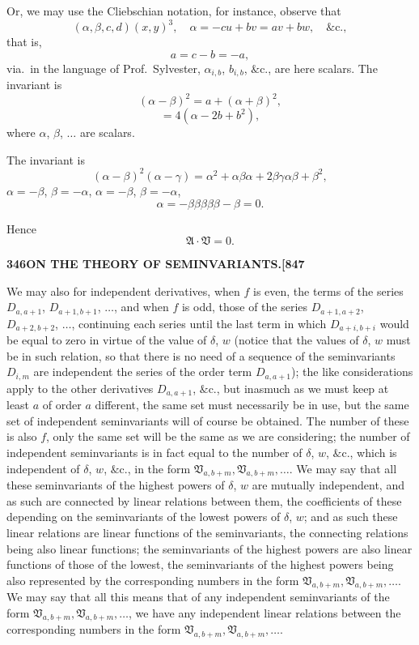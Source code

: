 \documentclass[11pt,a4paper]{book}
\begin{document}
Or, we may use the Cliebschian notation, for instance, observe that
\[
(\alpha, \beta, c, d)(x, y)^3, \quad \alpha = -cu + bv = av + bw, \quad \&\text{c.},
\]
that is,
\[
a = c - b = -a,
\]
via.\ in the language of Prof.\ Sylvester, $\alpha_{i,b}$, $b_{i,b}$, $\&\text{c.}$, are here scalars. The invariant is
\[
(\alpha - \beta)^2 = a + (\alpha + \beta)^2,
\]
\[
= 4(\alpha - 2b + b^2),
\]
where $\alpha$, $\beta$, $\ldots$ are scalars.

The invariant is
\[
(\alpha - \beta)^2(\alpha - \gamma) = \alpha^2 + \alpha\beta\alpha + 2\beta\gamma\alpha\beta + \beta^2,
\]
$\alpha = -\beta$, $\beta = -\alpha$, $\alpha = -\beta$, $\beta = -\alpha$,
\[
\alpha = -\beta\beta\beta\beta\beta - \beta = 0.
\]

Hence
\[
\mathfrak{A} \cdot \mathfrak{V} = 0.
\]

\newpage
\setcounter{page}{346}

\noindent\textbf{346}\hfill\textbf{ON THE THEORY OF SEMINVARIANTS.}\hfill\textbf{[847}

\bigskip

\noindent We may also for independent derivatives, when $f$ is even, the terms of the series $D_{a,a+1}$, $D_{a+1,b+1}$, $\ldots$, and when $f$ is odd, those of the series $D_{a+1,a+2}$, $D_{a+2,b+2}$, $\ldots$, continuing each series until the last term in which $D_{a+i,b+i}$ would be equal to zero in virtue of the value of $\delta$, $w$ (notice that the values of $\delta$, $w$ must be in such relation, so that there is no need of a sequence of the seminvariants $D_{i,m}$ are independent the series of the order term $D_{a,a+1}$); the like considerations apply to the other derivatives $D_{a,a+1}$, $\&\text{c.}$, but inasmuch as we must keep at least $a$ of order $a$ different, the same set must necessarily be in use, but the same set of independent seminvariants will of course be obtained. The number of these is also $f$, only the same set will be the same as we are considering; the number of independent seminvariants is in fact equal to the number of $\delta$, $w$, $\&\text{c.}$, which is independent of $\delta$, $w$, $\&\text{c.}$, in the form $\mathfrak{V}_{a,b+m}, \mathfrak{V}_{a,b+m}, \ldots$. We may say that all these seminvariants of the highest powers of $\delta$, $w$ are mutually independent, and as such are connected by linear relations between them, the coefficients of these depending on the seminvariants of the lowest powers of $\delta$, $w$; and as such these linear relations are linear functions of the seminvariants, the connecting relations being also linear functions; the seminvariants of the highest powers are also linear functions of those of the lowest, the seminvariants of the highest powers being also represented by the corresponding numbers in the form $\mathfrak{V}_{a,b+m}, \mathfrak{V}_{a,b+m}, \ldots$. We may say that all this means that of any independent seminvariants of the form $\mathfrak{V}_{a,b+m}, \mathfrak{V}_{a,b+m}, \ldots$, we have any independent linear relations between the corresponding numbers in the form $\mathfrak{V}_{a,b+m}, \mathfrak{V}_{a,b+m}, \ldots$.
\end{document}
